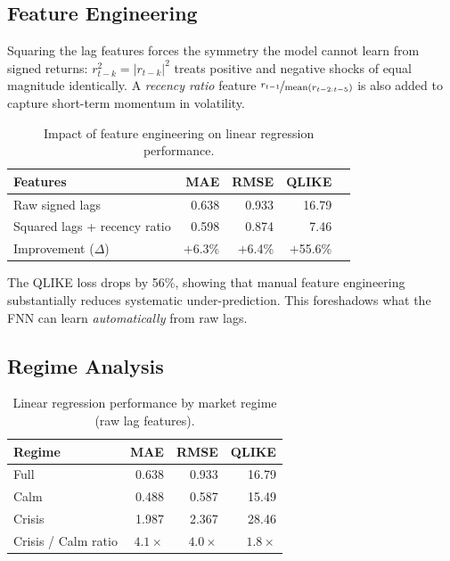 \subsection{Feature Engineering}

Squaring the lag features forces the symmetry the model cannot learn from signed returns:
$r_{t-k}^2 = |r_{t-k}|^2$ treats positive and negative shocks of equal magnitude
identically. A \emph{recency ratio} feature $\nicefrac{r_{t-1}}{\text{mean}(r_{t-2:t-5})}$
is also added to capture short-term momentum in volatility.

\begin{table}[H]
  \centering
  \caption{Impact of feature engineering on linear regression performance.}
  \label{tab:feat_eng}
  \begin{tabular}{lrrrr}
    \toprule
    Features & MAE & RMSE & QLIKE \\
    \midrule
    Raw signed lags             & 0.638 & 0.933 & 16.79 \\
    Squared lags + recency ratio & 0.598 & 0.874 &  7.46 \\
    \midrule
    Improvement ($\Delta$)       & $+$6.3\% & $+$6.4\% & $+$55.6\% \\
    \bottomrule
  \end{tabular}
\end{table}

The QLIKE loss drops by 56\%, showing that manual feature engineering substantially
reduces systematic under-prediction. This foreshadows what the FNN can learn
\emph{automatically} from raw lags.

\subsection{Regime Analysis}

\begin{table}[H]
  \centering
  \caption{Linear regression performance by market regime (raw lag features).}
  \label{tab:linreg_regime}
  \begin{tabular}{lrrr}
    \toprule
    Regime  & MAE   & RMSE  & QLIKE \\
    \midrule
    Full    & 0.638 & 0.933 & 16.79 \\
    Calm    & 0.488 & 0.587 & 15.49 \\
    Crisis  & 1.987 & 2.367 & 28.46 \\
    \midrule
    Crisis / Calm ratio & $4.1\times$ & $4.0\times$ & $1.8\times$ \\
    \bottomrule
  \end{tabular}
\end{table}

